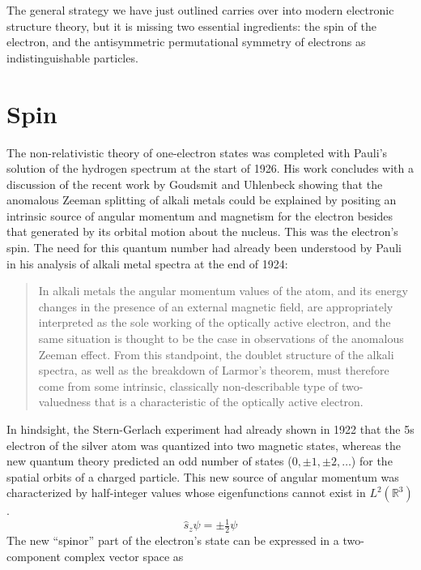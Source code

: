 The general strategy we have just outlined carries over into modern electronic
structure theory, but it is missing two essential ingredients: the spin of the
electron, and the antisymmetric permutational symmetry of electrons as
indistinguishable particles.


\section{Spin}

The non-relativistic theory of one-electron states was completed with Pauli's
solution of the hydrogen spectrum at the start of 1926.\cite{Pauli:1926p336}
His work concludes with a discussion of the recent work by Goudsmit and
Uhlenbeck\cite{Uhlenbeck:1925p953} showing that the anomalous Zeeman splitting
of alkali metals could be explained by positing an intrinsic source of angular
momentum and magnetism for the electron besides that generated by its orbital
motion about the nucleus.
This was the electron's spin.
The need for this quantum number had already been understood by Pauli in his
analysis of alkali metal spectra at the end of 1924:
\begin{quote}
    In alkali metals the angular momentum values of the atom, and its energy
    changes in the presence of an external magnetic field, are appropriately
    interpreted as the sole working of the optically active electron, and the
    same situation is thought to be the case in observations of the anomalous
    Zeeman effect.
    From this standpoint, the doublet structure of the alkali
    spectra, as well as the breakdown of Larmor's theorem, must
    therefore come from some intrinsic, classically non-describable
    type of two-valuedness that is a characteristic of the optically
    active electron.\cite{Pauli:1925p373}
\end{quote}
In hindsight, the Stern-Gerlach experiment\cite{Gerlach:1922p349} had already
shown in 1922 that the 5s electron of the silver atom was quantized into two
magnetic states, whereas the new quantum theory predicted an odd number of
states (\(0, \pm1, \pm2, \dots\)) for the spatial orbits of a charged particle.
This new source of angular momentum was characterized by half-integer values
whose eigenfunctions cannot exist in \(L^2(\mathbb{R}^3)\).
\begin{equation}
    \hat{s}_z
    \psi
    =
    \pm
    \tfrac{1}{2}
    \psi
\end{equation}
The new ``spinor'' part of the electron's state can be expressed in a
two-component complex vector space as
